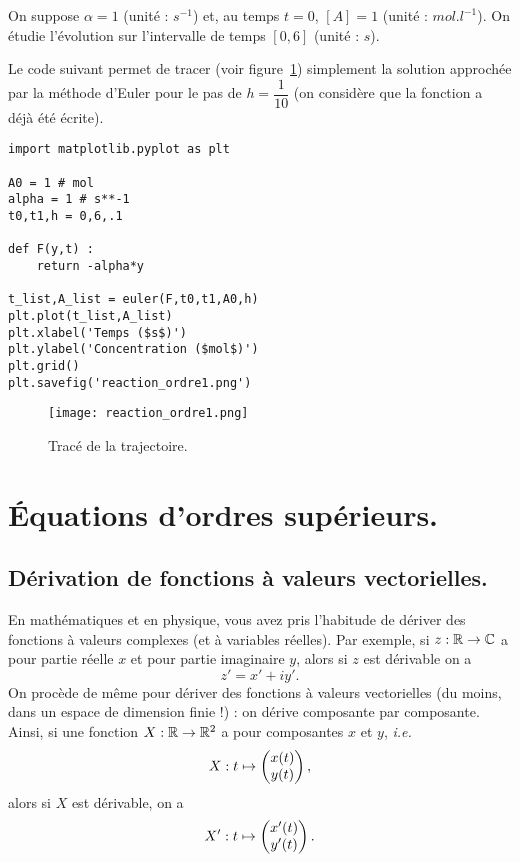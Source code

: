 On suppose $\alpha=1$ (unité : $s^{-1}$) et, au temps $t=0$, $[A] =
1$ (unité : $mol.l^{-1}$). 
On étudie l'évolution sur l'intervalle de temps $[0,6]$ (unité : $s$).


Le code suivant permet de tracer (voir figure~\ref{11:fig:reaction_ordre1}) simplement la solution approchée par la méthode d'Euler pour le pas de $h=\dfrac{1}{10}$ (on considère que la fonction  a déjà été écrite). 

\begin{lstlisting}
import matplotlib.pyplot as plt

A0 = 1 # mol
alpha = 1 # s**-1
t0,t1,h = 0,6,.1

def F(y,t) :
    return -alpha*y

t_list,A_list = euler(F,t0,t1,A0,h)
plt.plot(t_list,A_list)
plt.xlabel('Temps ($s$)')
plt.ylabel('Concentration ($mol$)')
plt.grid()
plt.savefig('reaction_ordre1.png')
\end{lstlisting}
\begin{figure}[!h]
    \begin{center}
        \texttt{[image: reaction\_ordre1.png]}
        \caption{Tracé de la trajectoire.}
        \label{11:fig:reaction_ordre1}
    \end{center}
\end{figure}

\section{Équations d'ordres supérieurs.}

\subsection{Dérivation de fonctions à valeurs vectorielles.}

En mathématiques et en physique, vous avez pris l'habitude de dériver des fonctions à valeurs complexes (et à variables réelles). 
Par exemple, si $z : \mathbb{R}\to\mathbb{C}$ a pour partie réelle $x$ et pour partie imaginaire $y$, alors si $z$ est dérivable on a 
\begin{equation*}
    z' = x' + iy'.
\end{equation*}
On procède de même pour dériver des fonctions à valeurs vectorielles (du moins, dans un espace de dimension finie !) : on dérive composante par composante. 
Ainsi, si une fonction $X : \mathbb{R}\to\mathbb{R}^2$ a pour composantes $x$ et $y$, \emph{i.e.} 
\begin{equation*}
    X : t \mapsto \begin{pmatrix} x(t) \\ y(t) \end{pmatrix},
\end{equation*}
alors si $X$ est dérivable, on a 
\begin{equation*}
    X' : t \mapsto \begin{pmatrix} x'(t) \\ y'(t) \end{pmatrix}.
\end{equation*}

